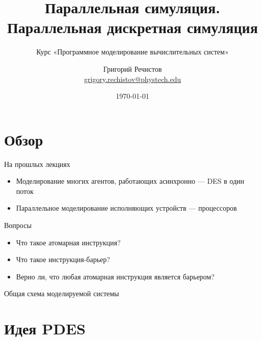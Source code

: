 \documentclass{beamer}
\title{Параллельная симуляция. Параллельная дискретная симуляция}
\subtitle{Курс «Программное моделирование вычислительных систем»}
\author[]{Григорий Речистов \\ \small{\href{mailto:grigory.rechistov@phystech.edu}{grigory.rechistov@phystech.edu}}}
\date{\today}
\begin{document}
\begin{frame}
\titlepage
\end{frame}

\begin{frame}
\tableofcontents
\end{frame} 

\section{Обзор}

\begin{frame}{На прошлых лекциях}
\begin{itemize}
\item Моделирование многих агентов, работающих асинхронно — DES в один поток
\item Параллельное моделирование исполняющих устройств — процессоров
\end{itemize}

\end{frame}

\begin{frame}{Вопросы}
\begin{itemize}
\item Что такое атомарная инструкция?\pause
\item Что такое инструкция-барьер?\pause
\item Верно ли, что любая атомарная инструкция является барьером?
\end{itemize}

\end{frame}


\begin{frame}{Общая схема моделируемой системы}

\centering


    
\end{frame}

\section{Идея PDES}
\end{document}

